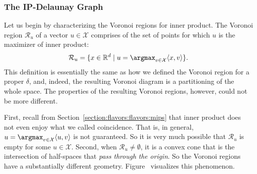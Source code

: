 \subsubsection{The IP-Delaunay Graph}
Let us begin by characterizing the Voronoi regions for inner product.
The Voronoi region $\mathcal{R}_u$ of a vector $u \in \mathcal{X}$ comprises of
the set of points for which $u$ is the maximizer of inner product:
\begin{equation*}
    \mathcal{R}_u = \{ x \in \mathbb{R}^d \;|\; u = \argmax_{v \in \mathcal{X}} \langle x, v \rangle \}.
\end{equation*}
This definition is essentially the same as how we defined the Voronoi region for a proper $\delta$,
and, indeed, the resulting Voronoi diagram is a partitioning of the whole space.
The properties of the resulting Voronoi regions, however, could not be more different.

First, recall from Section~\ref{section:flavors:flavors:mips} that inner product
does not even enjoy what we called coincidence. That is, in general, $u = \argmax_{v \in \mathcal{X}} \langle u, v \rangle$
is not guaranteed. So it is very much possible that $\mathcal{R}_u$ is empty for some
$u \in \mathcal{X}$. Second, when $\mathcal{R}_u \neq \emptyset$, it is a convex cone
that is the intersection of half-spaces that \emph{pass through the origin}. So the Voronoi
regions have a substantially different geometry. Figure~
visualizes this phenomenon.

